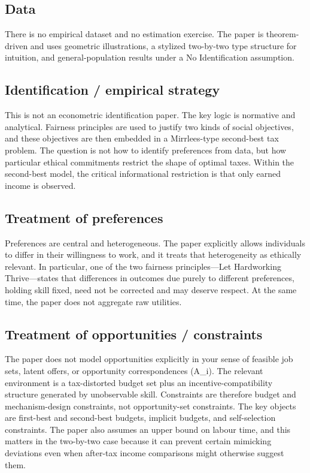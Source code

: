 \documentclass[11pt,a4paper]{article}
\begin{document}
\subsection*{Data}
There is no empirical dataset and no estimation exercise. The paper is theorem-driven and uses geometric illustrations, a stylized two-by-two type structure for intuition, and general-population results under a No Identification assumption.

\subsection*{Identification / empirical strategy}
This is not an econometric identification paper. The key logic is normative and analytical. Fairness principles are used to justify two kinds of social objectives, and these objectives are then embedded in a Mirrlees-type second-best tax problem. The question is not how to identify preferences from data, but how particular ethical commitments restrict the shape of optimal taxes. Within the second-best model, the critical informational restriction is that only earned income is observed.

\subsection*{Treatment of preferences}
Preferences are central and heterogeneous. The paper explicitly allows individuals to differ in their willingness to work, and it treats that heterogeneity as ethically relevant. In particular, one of the two fairness principles—Let Hardworking Thrive—states that differences in outcomes due purely to different preferences, holding skill fixed, need not be corrected and may deserve respect. At the same time, the paper does not aggregate raw utilities.

\subsection*{Treatment of opportunities / constraints}
The paper does not model opportunities explicitly in your sense of feasible job sets, latent offers, or opportunity correspondences (A\_i). The relevant environment is a tax-distorted budget set plus an incentive-compatibility structure generated by unobservable skill. Constraints are therefore budget and mechanism-design constraints, not opportunity-set constraints. The key objects are first-best and second-best budgets, implicit budgets, and self-selection constraints. The paper also assumes an upper bound on labour time, and this matters in the two-by-two case because it can prevent certain mimicking deviations even when after-tax income comparisons might otherwise suggest them.
\end{document}
